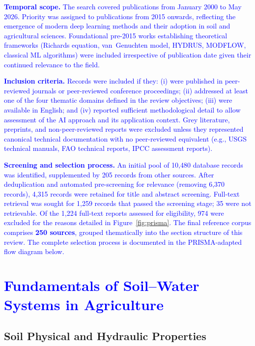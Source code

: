 \documentclass[land,article,submit,pdftex,moreauthors]{Definitions/mdpi}
\numberwithin{equation}{section}
\begin{document}
\textcolor{blue}{\textbf{Temporal scope.} The search covered publications from January 2000 to May 2026. Priority was assigned to publications from 2015 onwards, reflecting the emergence of modern deep learning methods and their adoption in soil and agricultural sciences. Foundational pre-2015 works establishing theoretical frameworks (Richards equation, van~Genuchten model, HYDRUS, MODFLOW, classical ML algorithms) were included irrespective of publication date given their continued relevance to the field.}

\textcolor{blue}{\textbf{Inclusion criteria.} Records were included if they: (i) were published in peer-reviewed journals or peer-reviewed conference proceedings; (ii) addressed at least one of the four thematic domains defined in the review objectives; (iii) were available in English; and (iv) reported sufficient methodological detail to allow assessment of the AI approach and its application context. Grey literature, preprints, and non-peer-reviewed reports were excluded unless they represented canonical technical documentation with no peer-reviewed equivalent (e.g., USGS technical manuals, FAO technical reports, IPCC assessment reports).}

\textcolor{blue}{\textbf{Screening and selection process.} An initial pool of 10,480 database records was identified, supplemented by 205 records from other sources. After deduplication and automated pre-screening for relevance (removing 6,370 records), 4,315 records were retained for title and abstract screening. Full-text retrieval was sought for 1,259 records that passed the screening stage; 35 were not retrievable. Of the 1,224 full-text reports assessed for eligibility, 974 were excluded for the reasons detailed in Figure~\ref{fig:prisma}. The final reference corpus comprises \textbf{250 sources}, grouped thematically into the section structure of this review. The complete selection process is documented in the PRISMA-adapted flow diagram below.}


\section{\textcolor{blue}{Fundamentals of Soil--Water Systems in Agriculture}}

\subsection{Soil Physical and Hydraulic Properties}
\end{document}
